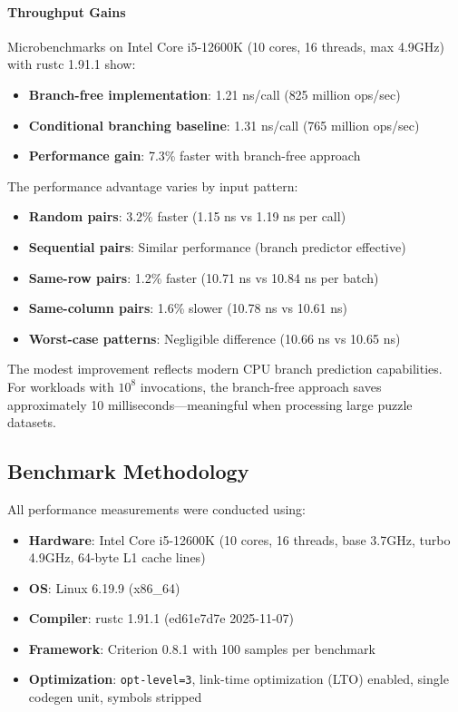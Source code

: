 \documentclass[11pt,a4paper]{article}
\begin{document}
\paragraph{Throughput Gains}
Microbenchmarks on Intel Core i5-12600K (10 cores, 16 threads, max 4.9GHz) with rustc 1.91.1 show:
\begin{itemize}
    \item \textbf{Branch-free implementation}: 1.21 ns/call (825 million ops/sec)
    \item \textbf{Conditional branching baseline}: 1.31 ns/call (765 million ops/sec)
    \item \textbf{Performance gain}: 7.3\% faster with branch-free approach
\end{itemize}

The performance advantage varies by input pattern:
\begin{itemize}
    \item \textbf{Random pairs}: 3.2\% faster (1.15 ns vs 1.19 ns per call)
    \item \textbf{Sequential pairs}: Similar performance (branch predictor effective)
    \item \textbf{Same-row pairs}: 1.2\% faster (10.71 ns vs 10.84 ns per batch)
    \item \textbf{Same-column pairs}: 1.6\% slower (10.78 ns vs 10.61 ns)
    \item \textbf{Worst-case patterns}: Negligible difference (10.66 ns vs 10.65 ns)
\end{itemize}

The modest improvement reflects modern CPU branch prediction capabilities. For workloads with $10^8$ invocations, the branch-free approach saves approximately 10 milliseconds—meaningful when processing large puzzle datasets.

\subsection{Benchmark Methodology}

All performance measurements were conducted using:
\begin{itemize}
    \item \textbf{Hardware}: Intel Core i5-12600K (10 cores, 16 threads, base 3.7GHz, turbo 4.9GHz, 64-byte L1 cache lines)
    \item \textbf{OS}: Linux 6.19.9 (x86\_64)
    \item \textbf{Compiler}: rustc 1.91.1 (ed61e7d7e 2025-11-07)
    \item \textbf{Framework}: Criterion 0.8.1 with 100 samples per benchmark
    \item \textbf{Optimization}: \texttt{opt-level=3}, link-time optimization (LTO) enabled, single codegen unit, symbols stripped
\end{itemize}
\end{document}
